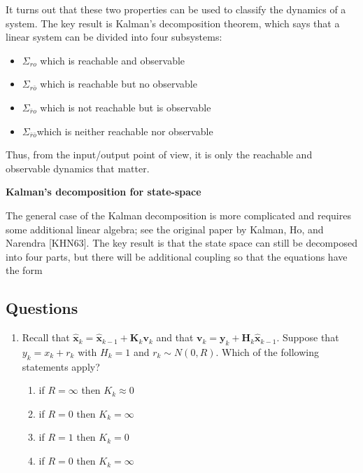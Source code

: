 It turns out that these two properties can be used to classify the dynamics of a system. The key
result is Kalman’s decomposition theorem, which says that a linear system can be
divided into four subsystems:

\begin{itemize}
\item $\Sigma_{ro}$ which is reachable and observable
\item $\Sigma_{r\bar{o}}$ which is reachable but no observable 
\item $\Sigma_{\bar{r}o}$ which is not reachable but is observable
\item $\Sigma_{\bar{r}\bar{o}}$which is neither reachable nor observable
\end{itemize}


Thus, from the input/output point of view, it is only the reachable and observable
dynamics that matter.

\begin{framed}
\theoremstyle{remark}
\begin{remark}{\textbf{Kalman's decomposition for state-space}}

The general case of the Kalman decomposition is more complicated and requires some additional linear algebra; 
see the original paper by Kalman, Ho, and Narendra [KHN63]. The key result is that the state space can still be decomposed
into four parts, but there will be additional coupling so that the equations have the form 
\end{remark}
\end{framed}

\subsection{Questions}
\label{questions_kalman_filters}

\begin{enumerate}
\item Recall that $\hat{\mathbf{x}}_k = \hat{\mathbf{x}}_{k-1} + \mathbf{K}_k\mathbf{v}_k$ and that $\mathbf{v}_k = \mathbf{y}_{k} + \mathbf{H}_k\hat{\mathbf{x}}_{k-1}$. Suppose that 
$y_k = x_k + r_k$ with $H_k = 1$ and $r_k \sim N(0,R)$. Which of the following statements apply?

\begin{enumerate}
\item if $R=\infty$ then $K_k \approx 0$
\item if $R=0$ then $K_k = \infty$
\item if $R=1$ then $K_k = 0$
\item if $R=0$ then $K_k = \infty$
\end{enumerate}
\end{enumerate}


